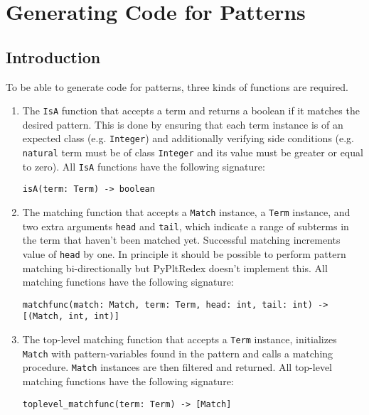 \section{Generating Code for Patterns}

\subsection{Introduction}

To be able to generate code for patterns, three kinds of functions are required.

\begin{enumerate}
\item
The \texttt{IsA} function that accepts a term and returns a boolean if it matches the desired pattern. This is done by ensuring that each term instance is of an expected class (e.g. \texttt{Integer}) and additionally verifying side conditions (e.g. \texttt{natural} term must be of class \texttt{Integer} and its value must be greater or equal to zero). All \texttt{IsA} functions have the following signature:

\begin{verbatim}
isA(term: Term) -> boolean
\end{verbatim}

\item
The matching function that accepts a \texttt{Match} instance, a \texttt{Term} instance, and two extra arguments \texttt{head} and \texttt{tail}, which indicate a range of subterms in the term that haven't been matched yet. Successful matching increments value of \texttt{head} by one. In principle it should be possible to perform pattern matching bi-directionally but PyPltRedex doesn't implement this. All matching functions have the following signature:

\begin{verbatim}
matchfunc(match: Match, term: Term, head: int, tail: int) -> [(Match, int, int)]
\end{verbatim}

\item
The top-level matching function that accepts a \texttt{Term} instance, initializes \texttt{Match} with pattern-variables found in the pattern and calls a matching procedure. \texttt{Match} instances are then filtered and returned. All top-level matching functions have the following signature:
\begin{verbatim}
toplevel_matchfunc(term: Term) -> [Match]
\end{verbatim}
\end{enumerate}


